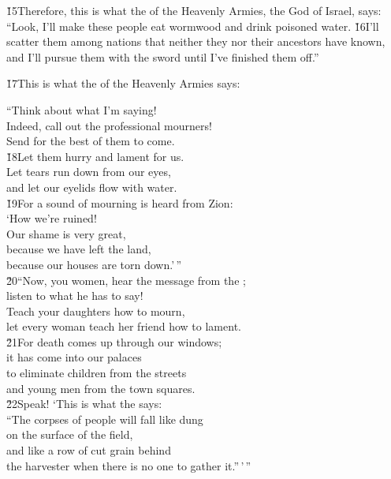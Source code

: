 \v{15}Therefore, this is what the  of the Heavenly Armies, the God of Israel, says: ``Look, I'll make these people eat wormwood and drink poisoned water. \v{16}I'll scatter them among nations that neither they nor their ancestors have known, and I'll pursue them with the sword until I've finished them off.''

\v{17}This is what the  of the Heavenly Armies says:

\begin{poetry}
\poeml ``Think about what I'm saying! \\
\poemll    Indeed, call out the professional mourners! \\
\poemlll       Send for the best of them to come. \\
\poeml \v{18}Let them hurry and lament for us. \\
\poemll    Let tears run down from our eyes, \\
\poemlll       and let our eyelids flow with water. \\
\poeml \v{19}For a sound of mourning is heard from Zion: \\
\poemll    `How we're ruined! \\
\poeml Our shame is very great, \\
\poemll    because we have left the land, \\
\poemlll       because our houses are torn down.'\,'' \\
\poeml \v{20}``Now, you women, hear the message from the ; \\
\poemll    listen to what he has to say! \\
\poeml Teach your daughters how to mourn, \\
\poemll    let every woman teach her friend how to lament. \\
\poeml \v{21}For death comes up through our windows; \\
\poemll    it has come into our palaces \\
\poeml to eliminate children from the streets \\
\poemll    and young men from the town squares. \\
\poeml \v{22}Speak! `This is what the  says: \\
\poeml ``The corpses of people will fall like dung \\
\poemll    on the surface of the field, \\
\poeml and like a row of cut grain behind \\
\poemll    the harvester when there is no one to gather it.''\,'\,''
\end{poetry}


